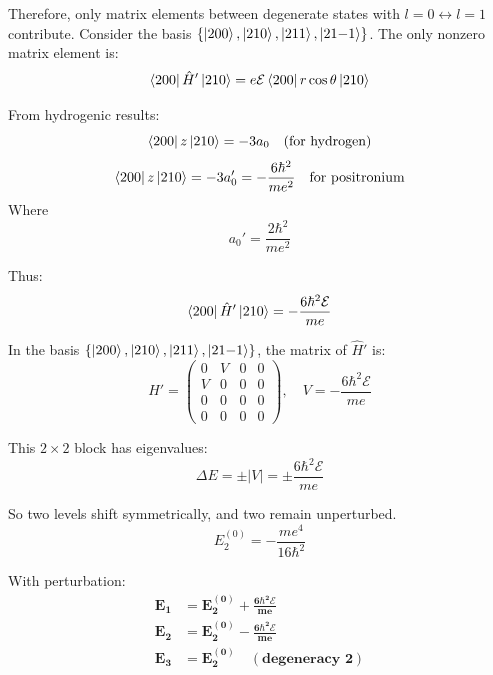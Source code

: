 \documentclass[12pt]{article}
\begin{document}
        Therefore, only matrix elements between degenerate states with \( l = 0 \leftrightarrow l = 1 \) contribute. Consider the basis \( \{ \ket{200}, \ket{210}, \ket{211}, \ket{21{-1}} \} \). The only nonzero matrix element is:
        \[
            \bra{200} \hat{H}' \ket{210} = e \mathcal{E} \bra{200} r\cos\theta \ket{210}
        \]
        
        From hydrogenic results:
        \[
            \bra{200} z \ket{210} = -3a_0 \quad \text{(for hydrogen)}
        \]
        \[
             \bra{200} z \ket{210} = -3a_0' = -\frac{6\hbar^2}{me^2} \quad \text{for positronium}
        \]
        Where 
        \[
            a_0' = \frac{2\hbar^2}{me^2}
        \]
        
        Thus:
        \[
            \bra{200} \hat{H}' \ket{210} = -\frac{6\hbar^2 \mathcal{E}}{m e}
        \]
        
        In the basis \( \{ \ket{200}, \ket{210}, \ket{211}, \ket{21{-1}} \} \), the matrix of \( \hat{H}' \) is:
        \[
            H' = 
            \begin{pmatrix}
                0 & V & 0 & 0 \\
                V & 0 & 0 & 0 \\
                0 & 0 & 0 & 0 \\
                0 & 0 & 0 & 0
            \end{pmatrix}, \quad V = -\frac{6\hbar^2 \mathcal{E}}{m e}
        \]
        
        This \( 2 \times 2 \) block has eigenvalues:
        \[
            \Delta E = \pm |V| = \pm \frac{6\hbar^2 \mathcal{E}}{m e}
        \]
        
        So two levels shift symmetrically, and two remain unperturbed.
        \[
            E_2^{(0)} = -\frac{m e^4}{16 \hbar^2}
        \]
        
        With perturbation:
        \[
            \boldsymbol{\boxed{
            \begin{aligned}
                E_1 &= E_2^{(0)} + \frac{6\hbar^2 \mathcal{E}}{m e} \\
                E_2 &= E_2^{(0)} - \frac{6\hbar^2 \mathcal{E}}{m e} \\
                E_3 &= E_2^{(0)} \quad (\text{degeneracy 2})
            \end{aligned}
            }}
        \]
\end{document}
